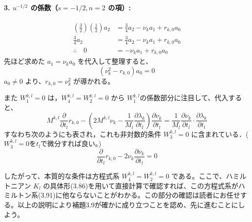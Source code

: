 \documentclass[paper=a4, fontsize=11pt]{jlreq} %
\newenvironment{story}{%
  \begin{mdframed}[
    backgroundcolor=red!5, %
    linewidth=0pt,         %
    innertopmargin=10pt,   %
    innerbottommargin=10pt,
    innerrightmargin=10pt, %
    innerleftmargin=10pt
  ]%
}{%
  \end{mdframed}%
}
\theoremstyle{break}
\theoremstyle{qa}
\begin{document}
\paragraph{3. $u^{-1/2}$ の係数（$s=-1/2, n=2$ の項）:}
\begin{align*}
    \left(\frac{3}{2}\right)\left(\frac{1}{2}\right) a_2 &= \frac{3}{4} a_2 - \nu_k a_1 + r_{k,0} a_0 \\
    \frac{3}{4} a_2 &= \frac{3}{4} a_2 - \nu_k a_1 + r_{k,0} a_0 \\
    \therefore \quad 0 &= -\nu_k a_1 + r_{k,0} a_0
\end{align*}
先ほど求めた $a_1 = \nu_k a_0$ を代入して整理すると、
\begin{equation*}
    (\nu_k^2 - r_{k,0}) a_0 = 0
\end{equation*}
$a_0 \neq 0$ より、$r_{k,0} = \nu_k^2$ が導かれる。
\begin{story}
また $W_1^{k,l}=0$ は，$W_4^{k,l}=W_2^{k,l}=0$ から $W_1^{k,l}$の係数部分に注目して、代入すると、
\[
    M^{k,l} \frac{\partial}{\partial t_l} r_{k,0} - \left( 2M^{k,l}\nu_k - \frac{1}{M_l} \frac{\partial \lambda_k}{\partial t_l} \right) \frac{\partial \nu_k}{\partial t_l} = \frac{1}{M_l} \frac{\partial \nu_k}{\partial t_l} \cdot \frac{\partial \lambda_k}{\partial t_l}
\]
すなわち次のようにも表され，これも非対数的条件 $W_3^{k,l}=0$ に含まれている．($W_3^{k,l}=0$を$t_{l}$で微分すれば良い。)
\begin{equation}
    \frac{\partial}{\partial t_l} r_{k,0} - 2\nu_k \frac{\partial \nu_k}{\partial t_l} = 0 \label{eq:rk0_derivative}
\end{equation}

したがって、本質的な条件は方程式系 $W_4^{k,l} = W_2^{k,l} = 0$ である。ここで、ハミルトニアン $K_l$ の具体形(3.86)を用いて直接計算で確認すれば、この方程式系がハミルトン系(3.91)に他ならないことがわかる。この部分の確認は読者にお任せする。以上の説明により補題3.9が確かに成り立つことを認め、先に進むことにしよう。
\end{story}
\end{document}
